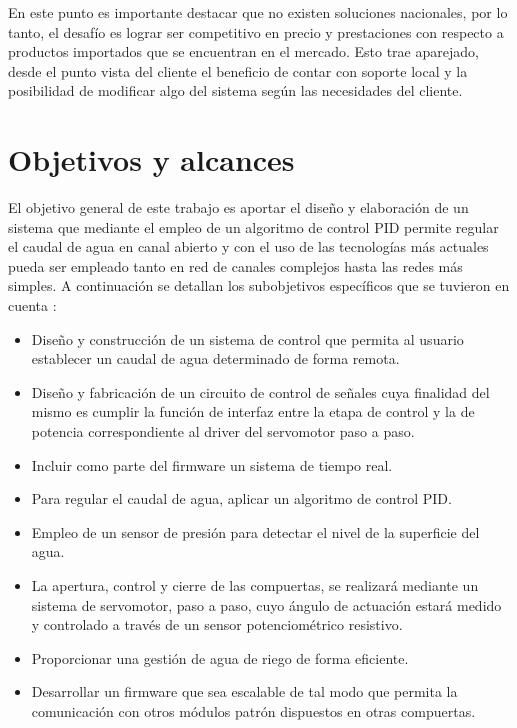 
En este punto es importante destacar que no existen soluciones nacionales, por lo tanto,  el desafío es lograr ser competitivo en precio y prestaciones con respecto a productos importados que se encuentran en el mercado. Esto trae aparejado, desde el punto vista del cliente el beneficio de contar con soporte local y la posibilidad de modificar algo del sistema según las necesidades del cliente.


\section{Objetivos y alcances}


El objetivo general de este trabajo es aportar el diseño y elaboración de un sistema que mediante el empleo de un algoritmo de control PID permite regular el caudal de agua en canal abierto y con el uso de las tecnologías más actuales pueda ser empleado tanto en red de canales complejos hasta las redes más simples. A continuación se detallan los subobjetivos específicos que se tuvieron en cuenta :  
\begin{itemize}
\item Diseño y construcción de  un sistema de control que permita al usuario establecer un caudal de agua determinado de forma remota.

\item Diseño y fabricación de un circuito de control de señales cuya finalidad del mismo es cumplir la función de interfaz entre la etapa de control y la de potencia correspondiente al driver del servomotor paso a paso. 
\item Incluir como parte del firmware un sistema de tiempo real.  
\item Para regular el caudal de agua, aplicar un algoritmo de control PID.
\item Empleo de un sensor de presión para detectar el nivel de la superficie del agua.
\item La apertura, control y cierre de las compuertas, se realizará mediante un sistema de servomotor, paso a paso, cuyo ángulo de actuación estará medido y controlado a través de un sensor potenciométrico resistivo.  
\item Proporcionar una gestión de agua de riego de forma eficiente.
\item Desarrollar un firmware que sea escalable de tal modo que permita la comunicación con otros módulos patrón dispuestos en otras compuertas. 
\end{itemize}


